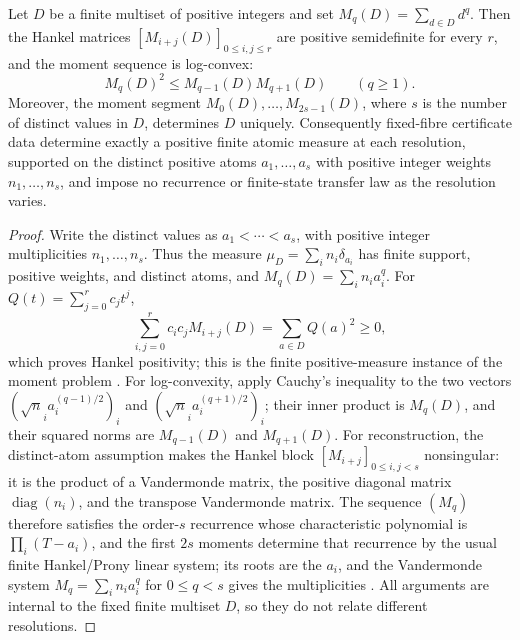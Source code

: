\begin{proposition}
\label{prop:classical-finite-atomic-skeleton}
Let \(D\) be a finite multiset of positive integers and set
\(M_q(D)=\sum_{d\in D}d^q\).  Then the Hankel matrices
\([M_{i+j}(D)]_{0\le i,j\le r}\) are positive semidefinite for every \(r\), and
the moment sequence is log-convex:
\[
  M_q(D)^2\le M_{q-1}(D)M_{q+1}(D)\qquad(q\ge1).
\]
Moreover,
the moment segment \(M_0(D),\ldots,M_{2s-1}(D)\), where \(s\) is the number of
distinct values in \(D\), determines \(D\) uniquely.  Consequently fixed-fibre
certificate data determine exactly a positive finite atomic measure at each
resolution, supported on the distinct positive atoms \(a_1,\ldots,a_s\) with
positive integer weights \(n_1,\ldots,n_s\), and impose no recurrence or
finite-state transfer law as the resolution varies.
\end{proposition}

\begin{proof}
Write the distinct values as \(a_1<\cdots<a_s\), with positive integer
multiplicities \(n_1,\ldots,n_s\).  Thus the measure
\(\mu_D=\sum_i n_i\delta_{a_i}\) has finite support, positive weights, and
distinct atoms, and \(M_q(D)=\sum_i n_i a_i^q\).  For
\(Q(t)=\sum_{j=0}^r c_jt^j\),
\[
  \sum_{i,j=0}^r c_i c_j M_{i+j}(D)=\sum_{a\in D} Q(a)^2\ge0,
\]
which proves Hankel positivity; this is the finite positive-measure instance of
the moment problem \cite{Hamburger1920,ShohatTamarkin1943,Akhiezer1965}.  For
log-convexity, apply Cauchy's inequality to the two vectors
\((\sqrt n_i a_i^{(q-1)/2})_i\) and \((\sqrt n_i a_i^{(q+1)/2})_i\); their inner
product is \(M_q(D)\), and their squared norms are \(M_{q-1}(D)\) and
\(M_{q+1}(D)\).  For
reconstruction, the distinct-atom assumption makes the Hankel block
\([M_{i+j}]_{0\le i,j<s}\) nonsingular: it is the product of a Vandermonde
matrix, the positive diagonal matrix \(\operatorname{diag}(n_i)\), and the
transpose Vandermonde matrix.  The sequence \((M_q)\) therefore satisfies the
order-\(s\) recurrence whose characteristic polynomial is
\(\prod_i(T-a_i)\), and the first \(2s\) moments determine that recurrence by
the usual finite Hankel/Prony linear system; its roots are the \(a_i\), and the
Vandermonde system
\(M_q=
\sum_i n_i a_i^q\) for \(0\le q<s\) gives the multiplicities
\cite{Prony1795,BatenkovYomdin2013}.  All arguments are internal to the fixed
finite multiset \(D\), so they do not relate different resolutions.
\end{proof}

